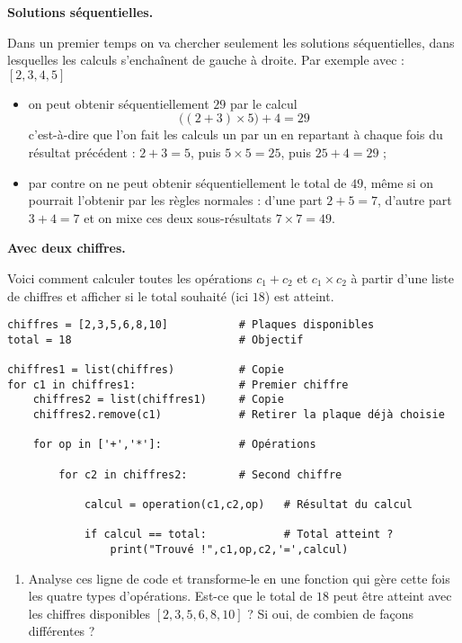 \documentclass[11pt,class=report,crop=false]{standalone}
\begin{document}
\begin{activite}
   
 
 
\textbf{Solutions séquentielles.}
 
Dans un premier temps on va chercher seulement les solutions séquentielles, dans lesquelles les calculs s'enchaînent de gauche à droite.
Par exemple avec : $[2,3,4,5]$ 
\begin{itemize} 
  \item on peut obtenir séquentiellement $29$ par le calcul
  $$\big((2+3)\times 5\big) + 4 = 29$$
  c'est-à-dire que l'on fait les calculs un par un  en repartant à chaque fois du résultat précédent : $2+3=5$, puis $5 \times 5 = 25$, puis $25+4=29$ ;
  \item par contre on ne peut obtenir séquentiellement le total de $49$,  
  même si on pourrait l'obtenir par les règles normales : 
  d'une part $2 + 5 = 7$, d'autre part $3+4 = 7$ et on mixe ces deux sous-résultats $7\times 7 = 49$.
\end{itemize}
  

\bigskip

\textbf{Avec deux chiffres.}

Voici comment calculer toutes les opérations $c_1 + c_2$ et $c_1 \times c_2$ à partir d'une liste de chiffres et afficher si le total souhaité (ici $18$) est atteint.
 
\begin{lstlisting}
chiffres = [2,3,5,6,8,10]           # Plaques disponibles
total = 18                          # Objectif

chiffres1 = list(chiffres)          # Copie
for c1 in chiffres1:                # Premier chiffre
    chiffres2 = list(chiffres1)     # Copie
    chiffres2.remove(c1)            # Retirer la plaque déjà choisie

    for op in ['+','*']:            # Opérations

        for c2 in chiffres2:        # Second chiffre
        
            calcul = operation(c1,c2,op)   # Résultat du calcul            

            if calcul == total:            # Total atteint ?
                print("Trouvé !",c1,op,c2,'=',calcul)
\end{lstlisting}

\begin{enumerate}
  \item Analyse ces ligne de code et transforme-le en une fonction  qui gère cette fois les quatre types d'opérations. Est-ce que le total de $18$ peut être atteint avec les chiffres disponibles $[2,3,5,6,8,10]$ ? Si oui, de combien de façons différentes ?
  

\end{enumerate}
\end{activite}
\end{document}
